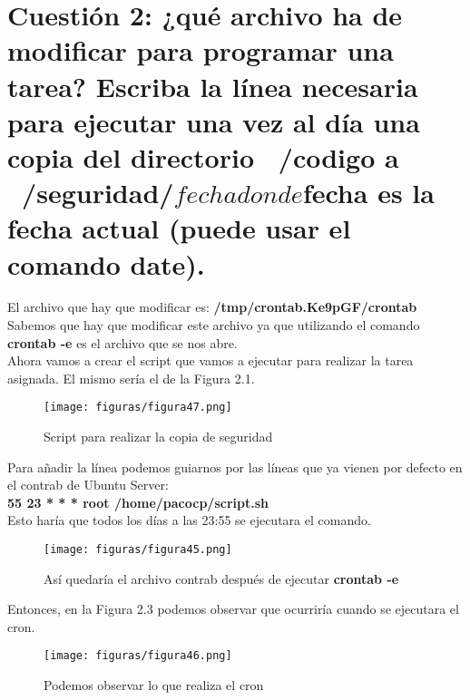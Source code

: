 \section{Cuestión 2: ¿qué archivo ha de modificar para programar una tarea? Escriba la línea necesaria para ejecutar una vez al día una copia del directorio ~/codigo a ~/seguridad/$fecha donde $fecha es la fecha actual (puede usar el comando date).}
El archivo que hay que modificar es: \textbf{/tmp/crontab.Ke9pGF/crontab} \cite{crontab}
Sabemos que hay que modificar este archivo ya que  utilizando el comando \textbf{crontab -e} \cite{crontab2} es el archivo que se nos abre.\\
Ahora vamos a crear el script que vamos a ejecutar para realizar la tarea asignada. El mismo sería el de la Figura 2.1.

\begin{figure}[H] %
	\centering
	\texttt{[image: figuras/figura47.png]}  %
	\label{figura47}
	
	\caption{Script para realizar la copia de seguridad} 
\end{figure}
Para añadir la línea podemos guiarnos por las líneas que ya vienen por defecto en el contrab de Ubuntu Server:\\
\textbf{55 23 * * * root  /home/pacocp/script.sh}\\

Esto haría que todos los días a las 23:55 se ejecutara el comando.
\begin{figure}[H] %
	\centering
	\texttt{[image: figuras/figura45.png]}  %
	\label{figura1}
	
	\caption{Así quedaría el archivo contrab después de ejecutar \textbf{crontab -e}} 
\end{figure}

Entonces, en la Figura 2.3 podemos observar que ocurriría cuando se ejecutara el cron.
\begin{figure}[H] %
	\centering
	\texttt{[image: figuras/figura46.png]}  %
	\label{figura46}
	
	\caption{Podemos observar lo que realiza el cron} 
\end{figure}
